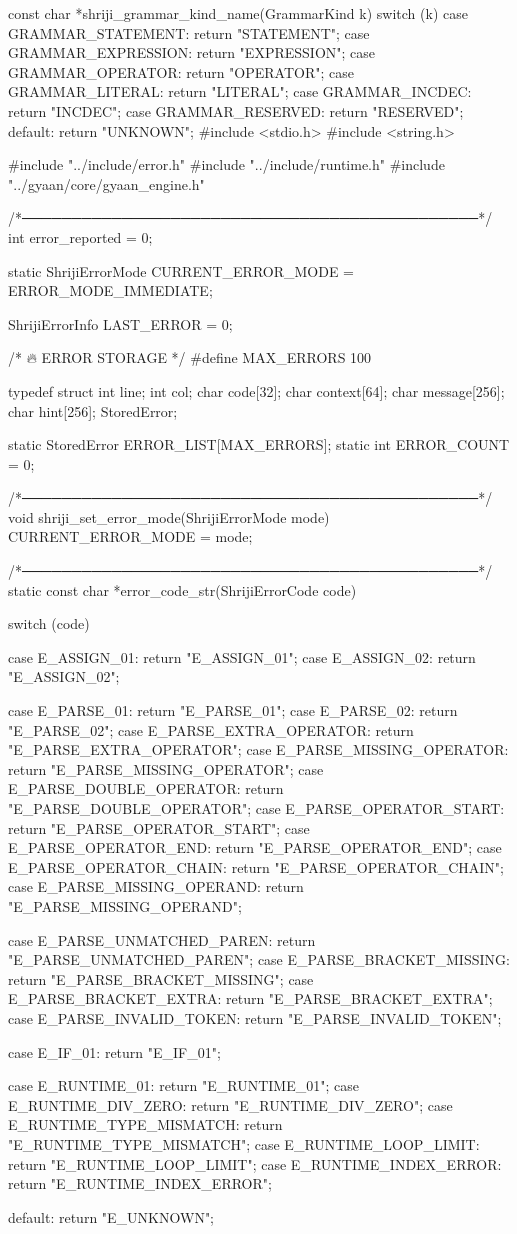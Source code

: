 \documentclass{article}
\begin{document}
const char *shriji_grammar_kind_name(GrammarKind k)
{
    switch (k) {
        case GRAMMAR_STATEMENT:  return "STATEMENT";
        case GRAMMAR_EXPRESSION: return "EXPRESSION";
        case GRAMMAR_OPERATOR:   return "OPERATOR";
        case GRAMMAR_LITERAL:    return "LITERAL";
        case GRAMMAR_INCDEC:     return "INCDEC";
        case GRAMMAR_RESERVED:   return "RESERVED";
        default:                 return "UNKNOWN";
    }
}
#include <stdio.h>
#include <string.h>

#include "../include/error.h"
#include "../include/runtime.h"
#include "../gyaan/core/gyaan_engine.h"

/*──────────────────────────────────────────────*/
int error_reported = 0;

static ShrijiErrorMode CURRENT_ERROR_MODE = ERROR_MODE_IMMEDIATE;

ShrijiErrorInfo LAST_ERROR = {0};


/* 🔥 ERROR STORAGE */
#define MAX_ERRORS 100

typedef struct {
    int line;
    int col;
    char code[32];
    char context[64];
    char message[256];
    char hint[256];
} StoredError;

static StoredError ERROR_LIST[MAX_ERRORS];
static int ERROR_COUNT = 0;


/*──────────────────────────────────────────────*/
void shriji_set_error_mode(ShrijiErrorMode mode)
{
    CURRENT_ERROR_MODE = mode;
}


/*──────────────────────────────────────────────*/
static const char *error_code_str(ShrijiErrorCode code)
{
    switch (code) {

        case E_ASSIGN_01: return "E_ASSIGN_01";
        case E_ASSIGN_02: return "E_ASSIGN_02";

        case E_PARSE_01: return "E_PARSE_01";
        case E_PARSE_02: return "E_PARSE_02";
        case E_PARSE_EXTRA_OPERATOR: return "E_PARSE_EXTRA_OPERATOR";
        case E_PARSE_MISSING_OPERATOR: return "E_PARSE_MISSING_OPERATOR";
        case E_PARSE_DOUBLE_OPERATOR: return "E_PARSE_DOUBLE_OPERATOR";
        case E_PARSE_OPERATOR_START: return "E_PARSE_OPERATOR_START";
        case E_PARSE_OPERATOR_END: return "E_PARSE_OPERATOR_END";
        case E_PARSE_OPERATOR_CHAIN: return "E_PARSE_OPERATOR_CHAIN";
        case E_PARSE_MISSING_OPERAND: return "E_PARSE_MISSING_OPERAND";

        case E_PARSE_UNMATCHED_PAREN: return "E_PARSE_UNMATCHED_PAREN";
        case E_PARSE_BRACKET_MISSING: return "E_PARSE_BRACKET_MISSING";
        case E_PARSE_BRACKET_EXTRA: return "E_PARSE_BRACKET_EXTRA";
        case E_PARSE_INVALID_TOKEN: return "E_PARSE_INVALID_TOKEN";

        case E_IF_01: return "E_IF_01";

        case E_RUNTIME_01: return "E_RUNTIME_01";
        case E_RUNTIME_DIV_ZERO: return "E_RUNTIME_DIV_ZERO";
        case E_RUNTIME_TYPE_MISMATCH: return "E_RUNTIME_TYPE_MISMATCH";
        case E_RUNTIME_LOOP_LIMIT: return "E_RUNTIME_LOOP_LIMIT";
        case E_RUNTIME_INDEX_ERROR: return "E_RUNTIME_INDEX_ERROR";

        default: return "E_UNKNOWN";
    }
}
\end{document}

